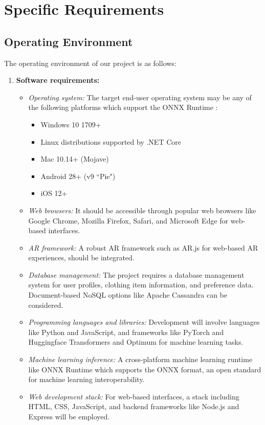 \section{Specific Requirements}
	\subsection{Operating Environment}
		The operating environment of our project is as follows:

		\begin{enumerate}
			\item \textbf{Software requirements:}
				\begin{itemize}
					\item \textit{Operating system:} The target end-user operating system may be any of the following platforms which support the ONNX Runtime \cite{onnxruntimeCompatibility}:
						\begin{itemize}
							\item Windows 10 1709+
							\item Linux distributions supported by .NET Core
							\item Mac 10.14+ (Mojave)
							\item Android 28+ (v9 ``Pie")
							\item iOS 12+
						\end{itemize}
					\item \textit{Web browsers:} It should be accessible through popular web browsers like Google Chrome, Mozilla Firefox, Safari, and Microsoft Edge for web-based interfaces.
					\item \textit{AR framework:} A robust AR framework such as AR.js for web-based AR experiences, should be integrated.
					\item \textit{Database management:} The project requires a database management system for user profiles, clothing item information, and preference data. Document-based NoSQL options like Apache Cassandra can be considered.
					\item \textit{Programming languages and libraries:} Development will involve languages like Python and JavaScript, and frameworks like PyTorch and Huggingface Transformers and Optimum for machine learning tasks.
					\item \textit{Machine learning inference:} A cross-platform machine learning runtime like ONNX Runtime which supports the ONNX format, an open standard for machine learning interoperability.
					\item \textit{Web development stack:} For web-based interfaces, a stack including HTML, CSS, JavaScript, and backend frameworks like Node.js and Express will be employed.

\end{itemize}
\end{enumerate}
